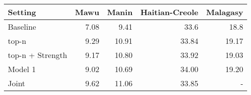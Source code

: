 \begin{tabular}{lrrrr}
\toprule
Setting & Mawu & Manin & Haitian-Creole & Malagasy \\
\toprule
Baseline & 7.08 & 9.41 & 33.6 & 18.8 \\
top-n & 9.29 & 10.91 & 33.84 & 19.17 \\
top-n + Strength & 9.17  & 10.80 & 33.92 & 19.03 \\
Model 1 & 9.02 & 10.69 & 34.00 & 19.20 \\
Joint & 9.62 & 11.06 & 33.85 & - \\
\bottomrule
\end{tabular}